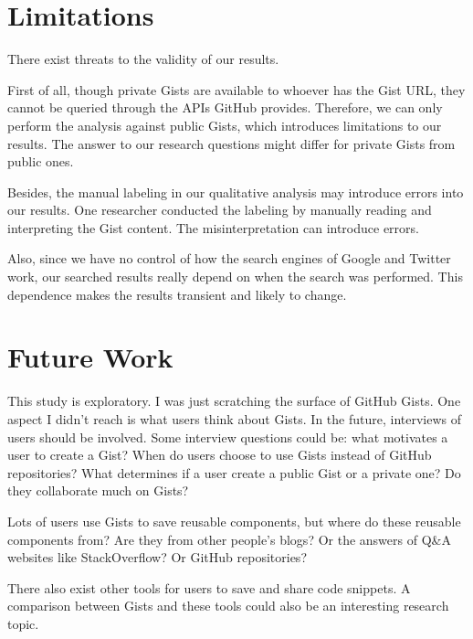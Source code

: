 
\section{Limitations}
There exist threats to the validity of our results. 

First of all, though private Gists are available to whoever has the Gist URL, they cannot be queried through the APIs GitHub provides. Therefore, we can only perform the analysis against public Gists, which introduces limitations to our results. The answer to our research questions might differ for private Gists from public ones.

Besides, the manual labeling in our qualitative analysis may introduce errors into our results. One researcher conducted the labeling by manually reading and interpreting the Gist content. The misinterpretation can introduce errors. 

Also, since we have no control of how the search engines of Google and Twitter work, our searched results really depend on when the search was performed. This dependence makes the results transient and likely to change. 

\section{Future Work}

This study is exploratory. I was just scratching the surface of GitHub Gists. One aspect I didn't reach is what users think about Gists. In the future, interviews of users should be involved. Some interview questions could be: what motivates a user to create a Gist? When do users choose to use Gists instead of GitHub repositories? What determines if a user create a public Gist or a private one? Do they collaborate much on Gists?

Lots of users use Gists to save reusable components, but where do these reusable components from? Are they from other people's blogs? Or the answers of Q\&A websites like StackOverflow? Or GitHub repositories? 

There also exist other tools for users to save and share code snippets. A comparison between Gists and these tools could also be an interesting research topic.